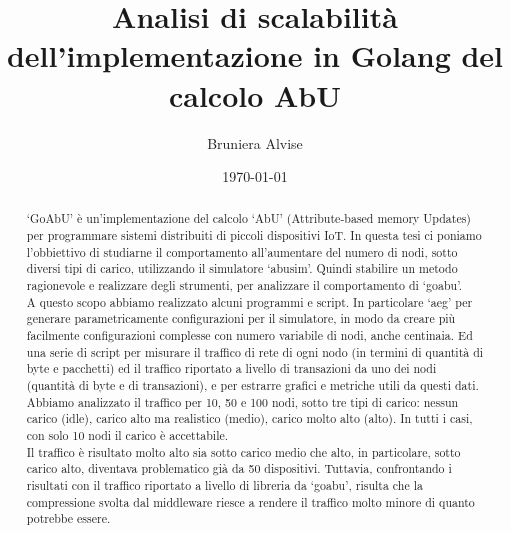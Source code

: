 \documentclass[12pt, a4paper]{article}
\title{Analisi di scalabilità dell'implementazione in Golang del calcolo AbU}
\author{Bruniera Alvise}
\affil{Università degli studi di Udine}
\date{\today}
\newcommand{\michele}[1]{{\color{red}Michele:~}{\itshape``{#1}''}}
\begin{document}
\maketitle

\newpage
\begin{abstract}
    `GoAbU' è un'implementazione del calcolo `AbU' (Attribute-based memory Updates) per programmare sistemi distribuiti di piccoli dispositivi IoT. In questa tesi ci poniamo l'obbiettivo di studiarne il comportamento all'aumentare del numero di nodi, sotto diversi tipi di carico, utilizzando il simulatore `abusim'. Quindi stabilire un metodo ragionevole e realizzare degli strumenti, per analizzare il comportamento di `goabu'.\\
    A questo scopo abbiamo realizzato alcuni programmi e script. In particolare `aeg' per generare parametricamente configurazioni per il simulatore, in modo da creare più facilmente configurazioni complesse con numero variabile di nodi, anche centinaia. Ed una serie di script per misurare il traffico di rete di ogni nodo (in termini di quantità di byte e pacchetti) ed il traffico riportato a livello di transazioni da uno dei nodi (quantità di byte e di transazioni), e per estrarre grafici e metriche utili da questi dati.\\
    Abbiamo analizzato il traffico per 10, 50 e 100 nodi, sotto tre tipi di carico: nessun carico (idle), carico alto ma realistico (medio), carico molto alto (alto). In tutti i casi, con solo 10 nodi il carico è accettabile.\\
    Il traffico è risultato molto alto sia sotto carico medio che alto, in particolare, sotto carico alto, diventava problematico già da 50 dispositivi. Tuttavia, confrontando i risultati con il traffico riportato a livello di libreria da `goabu', risulta che la compressione svolta dal middleware riesce a rendere il traffico molto minore di quanto potrebbe essere.

\end{abstract}
\end{document}
